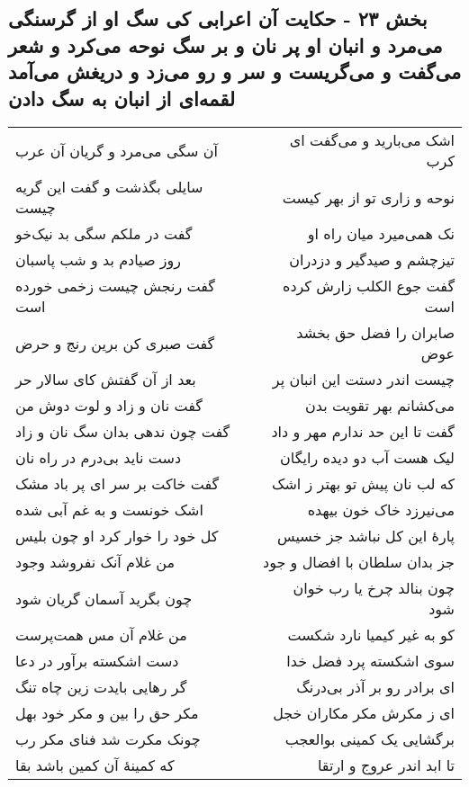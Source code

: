 \begin{center}
\section*{بخش ۲۳ - حکایت آن اعرابی کی سگ او از گرسنگی می‌مرد و انبان او پر نان و بر سگ نوحه می‌کرد و شعر می‌گفت و می‌گریست و سر و رو می‌زد و دریغش می‌آمد لقمه‌ای از انبان به سگ دادن}
\label{sec:sh023}
\begin{longtable}{l p{0.5cm} r}
آن سگی می‌مرد و گریان آن عرب
&&
اشک می‌بارید و می‌گفت ای کرب
\\
سایلی بگذشت و گفت این گریه چیست
&&
نوحه و زاری تو از بهر کیست
\\
گفت در ملکم سگی بد نیک‌خو
&&
نک همی‌میرد میان راه او
\\
روز صیادم بد و شب پاسبان
&&
تیزچشم و صیدگیر و دزدران
\\
گفت رنجش چیست زخمی خورده است
&&
گفت جوع الکلب زارش کرده است
\\
گفت صبری کن برین رنج و حرض
&&
صابران را فضل حق بخشد عوض
\\
بعد از آن گفتش کای سالار حر
&&
چیست اندر دستت این انبان پر
\\
گفت نان و زاد و لوت دوش من
&&
می‌کشانم بهر تقویت بدن
\\
گفت چون ندهی بدان سگ نان و زاد
&&
گفت تا این حد ندارم مهر و داد
\\
دست ناید بی‌درم در راه نان
&&
لیک هست آب دو دیده رایگان
\\
گفت خاکت بر سر ای پر باد مشک
&&
که لب نان پیش تو بهتر ز اشک
\\
اشک خونست و به غم آبی شده
&&
می‌نیرزد خاک خون بیهده
\\
کل خود را خوار کرد او چون بلیس
&&
پارهٔ این کل نباشد جز خسیس
\\
من غلام آنک نفروشد وجود
&&
جز بدان سلطان با افضال و جود
\\
چون بگرید آسمان گریان شود
&&
چون بنالد چرخ یا رب خوان شود
\\
من غلام آن مس همت‌پرست
&&
کو به غیر کیمیا نارد شکست
\\
دست اشکسته برآور در دعا
&&
سوی اشکسته پرد فضل خدا
\\
گر رهایی بایدت زین چاه تنگ
&&
ای برادر رو بر آذر بی‌درنگ
\\
مکر حق را بین و مکر خود بهل
&&
ای ز مکرش مکر مکاران خجل
\\
چونک مکرت شد فنای مکر رب
&&
برگشایی یک کمینی بوالعجب
\\
که کمینهٔ آن کمین باشد بقا
&&
تا ابد اندر عروج و ارتقا
\\
\end{longtable}
\end{center}
